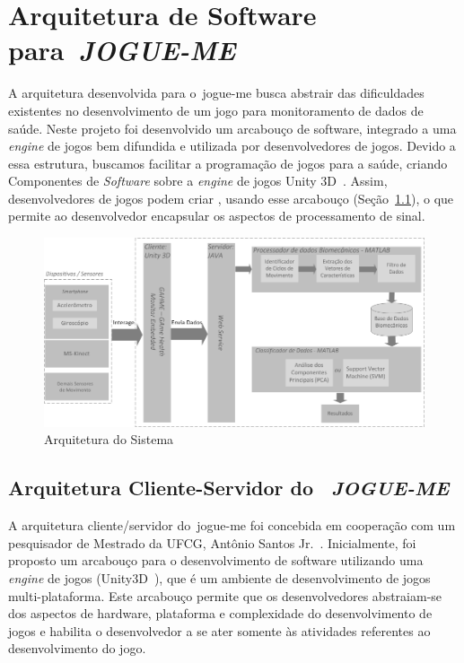 \chapter{Arquitetura de Software para~\textit{JOGUE-ME}}\label{chapter:arquitetura_captura}

A arquitetura desenvolvida para o~\ac{jogue-me} busca abstrair das dificuldades existentes no desenvolvimento de um jogo para monitoramento de dados de saúde. Neste projeto foi desenvolvido um arcabouço de software, integrado a uma \textit{engine} de jogos bem difundida e utilizada por desenvolvedores de jogos. Devido a essa estrutura, buscamos facilitar a programação de jogos para a saúde, criando Componentes de \textit{Software} sobre a \textit{engine} de jogos Unity 3D~\cite{unity3d}. Assim, desenvolvedores de jogos podem criar , usando esse arcabouço (Seção~\ref{sec:cliente_game}), o que permite ao desenvolvedor encapsular os aspectos de processamento de sinal. 


\begin{figure}[!htbp]
 \centering
  \includegraphics[scale=0.4]{./img/arquitetura.png}
\caption[Arquitetura do Sistema]{Arquitetura do Sistema}
 \label{fig:arquitetura}
\end{figure}

\section{Arquitetura Cliente-Servidor do ~\textit{JOGUE-ME}}\label{sec:cliente_game}
A arquitetura cliente/servidor do~\ac{jogue-me} foi concebida em cooperação com um pesquisador de Mestrado da UFCG, Antônio Santos Jr.~\cite{antonio2013}. Inicialmente, foi proposto um arcabouço para o desenvolvimento de software utilizando uma \textit{engine} de jogos (Unity3D~\cite{unity3d}), que é um ambiente de desenvolvimento de jogos multi-plataforma. Este arcabouço permite que os desenvolvedores abstraiam-se dos aspectos de hardware, plataforma e complexidade do desenvolvimento de jogos e habilita o desenvolvedor a se ater somente às atividades referentes ao desenvolvimento do jogo.

